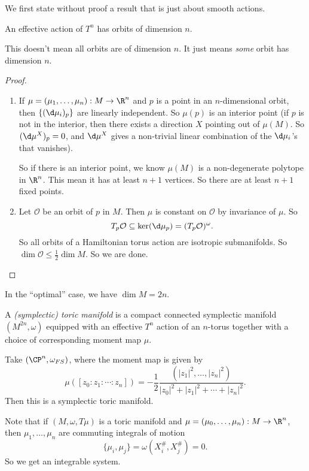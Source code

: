 \documentclass[a4paper]{article}
\begin{document}
We first state without proof a result that is just about smooth actions.
\begin{fact}
  An effective action of $T^n$ has orbits of dimension $n$.\fakeqed
\end{fact}
This doesn't mean all orbits are of dimension $n$. It just means \emph{some} orbit has dimension $n$.

\begin{proof}\leavevmode
  \begin{enumerate}
    \item If $\mu = (\mu_1, \ldots, \mu_n): M \to \R^n$ and $p$ is a point in an $n$-dimensional orbit, then $\{(\d \mu_i)_p\}$ are linearly independent. So $\mu(p)$ is an interior point (if $p$ is not in the interior, then there exists a direction $X$ pointing out of $\mu(M)$. So $(\d \mu^X)_p = 0$, and $\d \mu^X$ gives a non-trivial linear combination of the $\d \mu_i$'s that vanishes).

      So if there is an interior point, we know $\mu(M)$ is a non-degenerate polytope in $\R^n$. This mean it has at least $n + 1$ vertices. So there are at least $n + 1$ fixed points.
    \item Let $\mathcal{O}$ be an orbit of $p$ in $M$. Then $\mu$ is constant on $\mathcal{O}$ by invariance of $\mu$. So
      \[
        T_p \mathcal{O} \subseteq \ker (\d \mu_p) = (T_p \mathcal{O})^\omega.
      \]
      So all orbits of a Hamiltonian torus action are isotropic submanifolds. So $\dim \mathcal{O} \leq \frac{1}{2}\dim M$. So we are done.\qedhere
  \end{enumerate}
\end{proof}

In the ``optimal'' case, we have $\dim M = 2n$.
\begin{defi}
  A \emph{(symplectic) toric manifold} is a compact connected symplectic manifold $(M^{2n}, \omega)$ equipped with an effective $T^n$ action of an $n$-torus together with a choice of corresponding moment map $\mu$.
\end{defi}

\begin{eg}
  Take $(\CP^n, \omega_{FS})$, where the moment map is given by
  \[
    \mu([z_0:z_1:\cdots :z_n]) = - \frac{1}{2} \frac{(|z_1|^2, \ldots, |z_n|^2)}{|z_0|^2 + |z_1|^2 + \cdots + |z_n|^2}.
  \]
  Then this is a symplectic toric manifold.
\end{eg}

Note that if $(M, \omega, T \mu)$ is a toric manifold and $\mu = (\mu_0, \ldots, \mu_n): M \to \R^n$, then $\mu_1, \ldots, \mu_n$ are commuting integrals of motion
\[
  \{\mu_i, \mu_j\} = \omega(X_i^\#, X_j^\#) = 0.
\]
So we get an integrable system.
\end{document}
